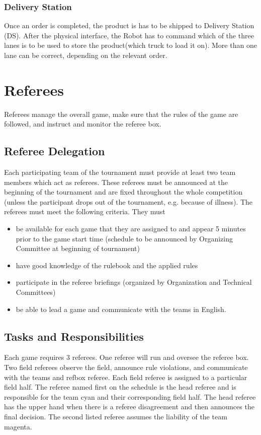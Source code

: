 \documentclass[12pt,twoside]{article}
\begin{document}
\subsubsection{Delivery Station} 
\label{sec:delivery-station}
Once an order is completed, the product is has to be shipped to
Delivery Station (DS). After the physical interface, the Robot has to
command which of the three lanes is to be used to store the
product(which truck to load it on). More than one lane can be correct,
depending on the relevant order.


\section{Referees}
Referees manage the overall game, make sure that the rules of the game
are followed, and instruct and monitor the referee box.

\subsection{Referee Delegation}
Each participating team of the tournament must provide at least two
team members which act as referees. These referees must be announced
at the beginning of the tournament and are fixed throughout the whole
competition (unless the participant drops out of the tournament,
e.g. because of illness). The referees must meet the following
criteria. They must

\begin{itemize}
\item be available for each game that they are assigned to and appear
  5 minutes prior to the game start time (schedule to be announced by
  Organizing Committee at beginning of tournament)
\item have good knowledge of the rulebook and the applied rules
\item participate in the referee briefings (organized by Organization
  and Technical Committees)
\item be able to lead a game and communicate with the teams in
  English.
\end{itemize}

\subsection{Tasks and Responsibilities}
Each game requires 3 referees. One referee will run and oversee the
referee box. Two field referees observe the field, announce rule
violations, and communicate with the teams and refbox referee. Each
field referee is assigned to a particular field half. The referee
named first on the schedule is the head referee and is responsible for the 
team cyan and their corresponding field half. The head referee has
the upper hand when there is a referee disagreement and then announces
the final decision. The second listed referee assumes the liability of the 
team magenta.
\end{document}
